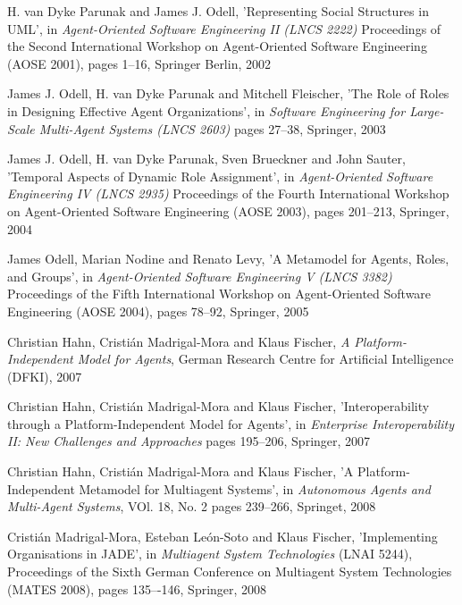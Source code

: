 \begin{thebibliography}{99}
H. van Dyke Parunak and James J. Odell,
'Representing Social Structures in UML',
in \textit{Agent-Oriented Software Engineering II (LNCS 2222)}
Proceedings of the Second International Workshop on Agent-Oriented Software Engineering (AOSE 2001),
pages 1--16,
Springer Berlin, 2002

James J. Odell, H. van Dyke Parunak and Mitchell Fleischer,
'The Role of Roles in Designing Effective Agent Organizations',
in \textit{Software Engineering for Large-Scale Multi-Agent Systems (LNCS 2603)}
pages 27--38,
Springer, 2003

James J. Odell, H. van Dyke Parunak, Sven Brueckner and John Sauter,
'Temporal Aspects of Dynamic Role Assignment',
in \textit{Agent-Oriented Software Engineering IV (LNCS 2935)}
Proceedings of the Fourth International Workshop on Agent-Oriented Software Engineering (AOSE 2003),
pages 201--213,
Springer, 2004

James Odell, Marian Nodine and Renato Levy,
'A Metamodel for Agents, Roles, and Groups',
in \textit{Agent-Oriented Software Engineering V (LNCS 3382)}
Proceedings of the Fifth International Workshop on Agent-Oriented Software Engineering (AOSE 2004),
pages 78--92,
Springer, 2005


Christian Hahn, Cristián Madrigal-Mora and Klaus Fischer,
\textit{A Platform-Independent Model for Agents},
German Research Centre for Artificial Intelligence (DFKI), 2007

Christian Hahn, Cristián Madrigal-Mora and Klaus Fischer,
'Interoperability through a Platform-Independent Model for Agents',
in \textit{Enterprise Interoperability II: New Challenges and Approaches}
pages 195--206,
Springer, 2007

Christian Hahn, Cristián Madrigal-Mora and Klaus Fischer,
'A Platform-Independent Metamodel for Multiagent Systems',
in \textit{Autonomous Agents and Multi-Agent Systems}, VOl. 18, No. 2
pages 239--266,
Springet, 2008

Cristián Madrigal-Mora, Esteban León-Soto and Klaus Fischer,
'Implementing Organisations in JADE',
in \textit{Multiagent System Technologies} (LNAI 5244),
Proceedings of the Sixth German Conference on Multiagent System Technologies (MATES 2008),
pages 135–-146,
Springer, 2008


\end{thebibliography}
